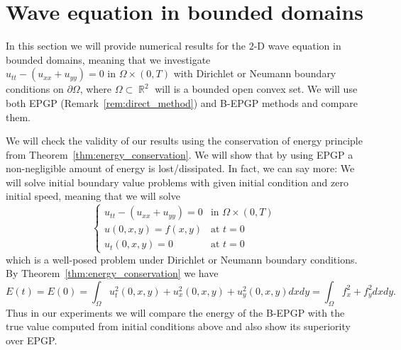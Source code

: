 \documentclass{article} %
\theoremstyle{plain}
\theoremstyle{definition}
\theoremstyle{remark}
\DeclareMathOperator*{\R}{\mathbb{R}}
\begin{document}
\section{Wave equation in bounded domains}\label{sec:wave_full}

In this section we will provide numerical results for the $2$-D wave equation in bounded domains, meaning that we investigate
$
    u_{tt}- (u_{xx}+u_{yy})=0\text{ in }\Omega\times (0,T)
$
with Dirichlet or Neumann boundary conditions on $\partial\Omega$, where $\Omega\subset\R^2$ will is a bounded open convex set. We will use both EPGP (Remark~\ref{rem:direct_method}) and B-EPGP methods and compare them.

We will check the validity of our results using the conservation of energy principle from Theorem~\ref{thm:energy_conservation}. We will show that by using EPGP a non-negligible amount of energy is lost/dissipated. In fact, we can say more: We will solve initial boundary value problems with given initial condition and zero initial speed, meaning that we will solve  
$$
\begin{cases}
       u_{tt}- (u_{xx}+u_{yy})=0&\text{in }\Omega\times (0,T)\\
       u(0,x,y)=f(x,y)&\text{at }t=0\\
       u_t(0,x,y)=0&\text{at }t=0
\end{cases}
$$
which is a well-posed problem under Dirichlet or Neumann boundary conditions. By Theorem~\ref{thm:energy_conservation} we have
$$
E(t)=E(0)=\int_\Omega u_t^2(0,x,y)+u_x^2(0,x,y)+u_y^2(0,x,y)dxdy=\int_\Omega f_x^2+f_y^2dxdy.
$$
Thus in our experiments we will compare the energy of the B-EPGP with the true value computed from initial conditions above and also show its superiority over EPGP.
\end{document}
